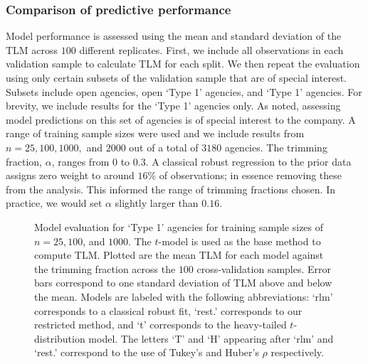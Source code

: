 \documentclass[12pt]{article}
\begin{document}
\subsubsection{Comparison of predictive performance}
Model performance is assessed
using the mean and standard deviation of the TLM 
across $100$ different replicates. First, we include all observations
in each validation sample to calculate TLM for each split. We then
repeat the evaluation using only certain subsets of the validation
sample that are of special interest. Subsets include open agencies,
open `Type 1' agencies, and `Type 1' agencies. For brevity, we include
results for the `Type 1' agencies only. As noted, assessing model
predictions on this set of agencies is of special interest to the
company.  A range of training sample sizes were used and we include
results from $n=25,100,1000,$ and $2000$ out of a total of $3180$ agencies. The trimming fraction, $\alpha$, ranges from $0$ to $0.3$. A classical robust regression to the prior data assigns zero weight to around $16\%$ of observations; in essence removing these from the analysis. This informed the range of trimming fractions chosen.  
In practice, we would set $\alpha$ slightly larger than $0.16$.  

\begin{figure}[t]
\centering
{}\quad
{}\quad
{}
\caption{Model evaluation for `Type 1' agencies for training sample
  sizes of $n=25,100$, and $1000$. The $t$-model is used as the base
  method to compute TLM. Plotted are the mean TLM for each model
  against the trimming fraction across the $100$ cross-validation
  samples. Error bars correspond to one standard deviation of TLM
  above and below the mean. Models are labeled with the following
  abbreviations: `rlm' corresponds to a classical robust fit, `rest.'
  corresponds to our restricted method, and `t' corresponds to the
  heavy-tailed $t$-distribution model. The letters `T' and `H'
  appearing after `rlm' and `rest.' correspond to the use of  Tukey's
  and Huber's $\rho$ respectively. 
}
\label{fig:Type1Marg}
\end{figure}
\end{document}

